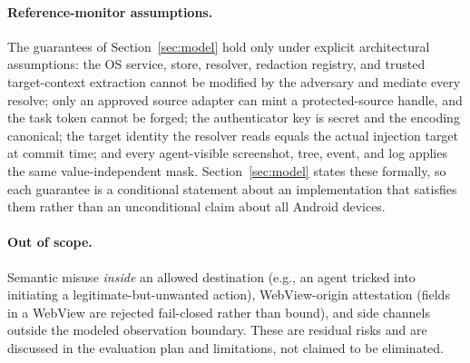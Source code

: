 \paragraph{Reference-monitor assumptions.} The guarantees of Section~\ref{sec:model} hold only under explicit architectural assumptions: the OS service, store, resolver, redaction registry, and trusted target-context extraction cannot be modified by the adversary and mediate every resolve; only an approved source adapter can mint a protected-source handle, and the task token cannot be forged; the authenticator key is secret and the encoding canonical; the target identity the resolver reads equals the actual injection target at commit time; and every agent-visible screenshot, tree, event, and log applies the same value-independent mask. Section~\ref{sec:model} states these formally, so each guarantee is a conditional statement about an implementation that satisfies them rather than an unconditional claim about all Android devices.

\paragraph{Out of scope.} Semantic misuse \emph{inside} an allowed destination (e.g., an agent tricked into initiating a legitimate-but-unwanted action), WebView-origin attestation (fields in a WebView are rejected fail-closed rather than bound), and side channels outside the modeled observation boundary. These are residual risks and are discussed in the evaluation plan and limitations, not claimed to be eliminated.
